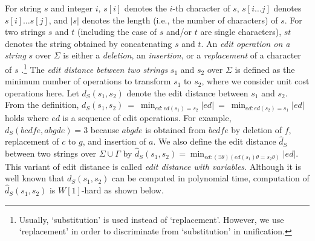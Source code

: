 \documentclass[a4paper]{llncs}
\begin{document}
For string $s$ and integer $i$, $s[i]$ denotes the $i$-th character of $s$,
$s[i \ldots j]$ denotes $s[i] \ldots s[j]$, and
$|s|$ denotes the length (i.e., the number of characters) of $s$.
For two strings $s$ and $t$ (including the case of $s$ and/or $t$ are
single characters),
$st$ denotes the string obtained by concatenating $s$ and $t$.
An {\it edit operation on a string} $s$ over $\Sigma$ is either
a {\it deletion}, an {\it insertion}, 
or a {\it replacement} of a character of $s$ \cite{bodlaender95}.\footnote{
Usually, `substitution' is used instead of `replacement'.
However, we use `replacement' in order to discriminate
from `substitution' in unification.}
The {\it edit distance between two strings} $s_1$ and $s_2$ over $\Sigma$
is defined as
the minimum number of operations to transform $s_1$ to $s_2$,
where we consider unit cost operations here.
Let $d_S(s_1,s_2)$ denote the edit distance 
between $s_1$ and $s_2$.
From the definition, 
$
d_S(s_1,s_2) ~=~ \min_{ed:ed(s_1)=s_2} |ed| ~=~ \min_{ed:ed(s_2)=s_1} |ed|
$  
holds where $ed$ is a sequence of edit operations.
For example, $d_S(bcdfe,abgde)=3$ because $abgde$ is obtained from
$bcdfe$ by deletion of $f$, replacement of $c$ to $g$, and insertion of $a$. 
We also define the edit distance $\hat{d}_S$
between two strings over $\Sigma \cup \Gamma$
by
$
\hat{d}_S(s_1,s_2) =
\min_{ed:(\exists \theta)(ed(s_1)\theta = s_2 \theta)} |ed|.
$
This variant of edit distance is called \emph{edit distance with variables}.
Although it is well known that $d_S(s_1,s_2)$ can be computed
in polynomial time, computation of $\hat{d}_S(s_1,s_2)$ is $W[1]$-hard
as shown below.
\end{document}
